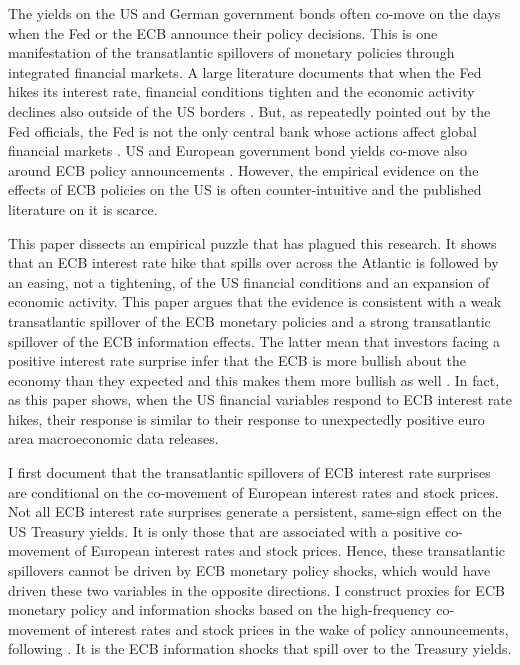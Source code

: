 \documentclass[a4paper,12pt]{article}
\begin{document}
The yields on the US and German government bonds often co-move on the days when the Fed or the ECB announce their policy decisions.
This is one manifestation of the transatlantic spillovers of monetary policies through integrated financial markets.
A large literature documents that when the Fed hikes its interest rate, financial conditions tighten and the economic activity declines also outside of the US borders \citep[][and many others]{Rey_2013,MirandaAgrippino_Rey_2020}. 
But, as repeatedly pointed out by the Fed officials, the Fed is not the only central bank whose actions affect global financial markets \citep[e.g.][]{Powell_2018,Clarida_2021}.
US and European government bond yields co-move also around ECB policy announcements \citep[e.g.][]{Curcuru_DePooter_Eckerd_2018}.
However, the empirical evidence on the effects of ECB policies on the US is often counter-intuitive and the published literature on it is scarce.

This paper dissects an empirical puzzle that has plagued this research. It
shows that an ECB interest rate hike that spills over across the Atlantic is followed
by an easing, not a tightening, of the US financial conditions and an expansion of economic activity.
This paper argues that the evidence is consistent with a weak transatlantic spillover of the ECB monetary policies and
a strong transatlantic spillover of the ECB information effects. 
The latter mean that investors facing a positive interest rate
surprise infer that the ECB is more bullish about the economy than they expected and this makes them more bullish as well \citep{Romer_Romer_2000,Nakamura_Steinsson_2018}.
 In fact, as this paper shows, when the US financial variables respond to ECB interest rate hikes,
their response is similar to their response to unexpectedly positive euro area macroeconomic data releases.

I first document that the transatlantic spillovers of ECB interest rate surprises are conditional
on the co-movement of European interest rates and stock prices.
Not all ECB interest rate surprises generate a persistent, same-sign effect on the US Treasury yields.
It is only those that are associated with a positive co-movement of European interest rates and stock prices.
Hence, these transatlantic spillovers cannot be driven by ECB monetary policy shocks,
which would have driven these two variables in the opposite directions.
I construct proxies for ECB monetary policy and information shocks based on the
high-frequency co-movement of interest rates and stock prices in the wake of policy announcements, following \cite{Jarocinski_Karadi_2020}.
It is the ECB information shocks that spill over to the Treasury yields.
\end{document}
